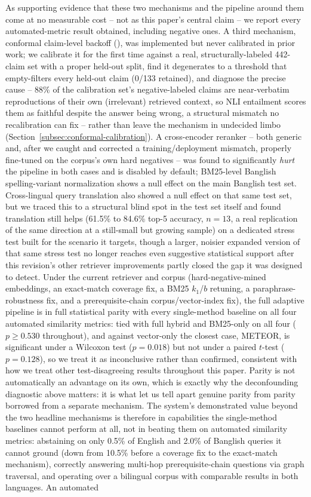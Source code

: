 \documentclass[a4paper,twoside]{article}
\begin{document}
{As supporting evidence that these two mechanisms and the pipeline around them come at no measurable cost -- not as this paper's central claim -- we report every automated-metric result obtained, including negative ones. A third mechanism, conformal claim-level backoff (\citealp{mohri2024conformal}), was implemented but never calibrated in prior work; we calibrate it for the first time against a real, structurally-labeled 442-claim set with a proper held-out split, find it degenerates to a threshold that empty-filters every held-out claim (0/133 retained), and diagnose the precise cause -- 88\% of the calibration set's negative-labeled claims are near-verbatim reproductions of their own (irrelevant) retrieved context, so NLI entailment scores them as faithful despite the answer being wrong, a structural mismatch no recalibration can fix -- rather than leave the mechanism in undecided limbo (Section~\ref{subsec:conformal-calibration}). A cross-encoder reranker -- both generic and, after we caught and corrected a training/deployment mismatch, properly fine-tuned on the corpus's own hard negatives -- was found to significantly \emph{hurt} the pipeline in both cases and is disabled by default; BM25-level Banglish spelling-variant normalization shows a null effect on the main Banglish test set. Cross-lingual query translation also showed a null effect on that same test set, but we traced this to a structural blind spot in the test set itself and found translation still helps (61.5\% to 84.6\% top-5 accuracy, $n=13$, a real replication of the same direction at a still-small but growing sample) on a dedicated stress test built for the scenario it targets, though a larger, noisier expanded version of that same stress test no longer reaches even suggestive statistical support after this revision's other retriever improvements partly closed the gap it was designed to detect. Under the current retriever and corpus (hard-negative-mined embeddings, an exact-match coverage fix, a BM25 $k_1$/$b$ retuning, a paraphrase-robustness fix, and a prerequisite-chain corpus/vector-index fix), the full adaptive pipeline is in full statistical parity with every single-method baseline on all four automated similarity metrics: tied with full hybrid and BM25-only on all four ($p\geq0.530$ throughout), and against vector-only the closest case, METEOR, is significant under a Wilcoxon test ($p=0.018$) but not under a paired $t$-test ($p=0.128$), so we treat it as inconclusive rather than confirmed, consistent with how we treat other test-disagreeing results throughout this paper. Parity is not automatically an advantage on its own, which is exactly why the deconfounding diagnostic above matters: it is what let us tell apart genuine parity from parity borrowed from a separate mechanism. The system's demonstrated value beyond the two headline mechanisms is therefore in capabilities the single-method baselines cannot perform at all, not in beating them on automated similarity metrics: abstaining on only 0.5\% of English and 2.0\% of Banglish queries it cannot ground (down from 10.5\% before a coverage fix to the exact-match mechanism), correctly answering multi-hop prerequisite-chain questions via graph traversal, and operating over a bilingual corpus with comparable results in both languages. An automated }
\end{document}

